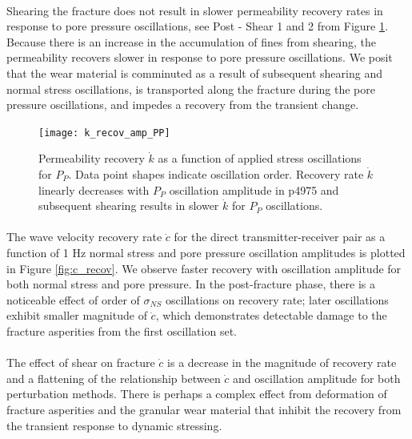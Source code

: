 \documentclass[letterpaper,10pt]{article}
\begin{document}
	\paragraph{}
	Shearing the fracture does not result in slower permeability recovery rates in response to pore pressure oscillations, see Post - Shear 1 and 2 from Figure \ref{fig:k_recov}. Because there is an increase in the accumulation of fines from shearing, the permeability recovers slower in response to pore pressure oscillations. We posit that the wear material is comminuted as a result of subsequent shearing and normal stress oscillations, is transported along the fracture during the pore pressure oscillations, and impedes a recovery from the transient change.
	
	\clearpage
	
	\begin{figure}[ht]
		\centering
		\texttt{[image: k\_recov\_amp\_PP]}
		\caption{Permeability recovery $ \dot k $ as a function of applied stress oscillations for $ P_P $. Data point shapes indicate oscillation order. Recovery rate $ \dot k $ linearly decreases with $ P_P $ oscillation amplitude in p4975 and subsequent shearing results in slower $ \dot k $ for $ P_P $ oscillations. }
		\label{fig:k_recov}
	\end{figure}
	\clearpage
	
	\paragraph{}
	The wave velocity recovery rate $ \dot c $ for the direct transmitter-receiver pair as a function of 1 Hz normal stress and pore pressure oscillation amplitudes is plotted in Figure \ref{fig:c_recov}. We observe faster recovery with oscillation amplitude for both normal stress and pore pressure. In the post-fracture phase, there is a noticeable effect of order of $ \sigma_{NS} $ oscillations on recovery rate; later oscillations exhibit smaller magnitude of $ \dot c$, which demonstrates detectable damage to the fracture asperities from the first oscillation set.  
	
	\paragraph{}
	The effect of shear on fracture $ \dot c $ is a decrease in the magnitude of recovery rate and a flattening of the relationship between $ \dot c $ and oscillation amplitude for both perturbation methods. There is perhaps a complex effect from deformation of fracture asperities and the granular wear material that inhibit the recovery from the transient response to dynamic stressing.  
	
\end{document}
